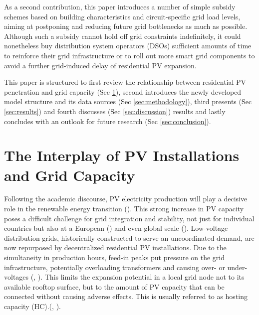 \documentclass[12PT, ]{article}
\begin{document}
As a second contribution, this paper introduces a number of simple subsidy schemes based on building characteristics and circuit-specific grid load levels, aiming at postponing and reducing future grid bottlenecks as much as possible. Although such a subsidy cannot hold off grid constraints indefinitely, it could nonetheless buy distribution system operators (DSOs) sufficient amounts of time to reinforce their grid infrastructure or to roll out more smart grid components to avoid a further grid-induced delay of residential PV expansion. 

This paper is structured to first review the relationship between residential PV penetration and grid capacity (Sec \ref{sec:lit_review}), second introduces the newly developed model structure and its data sources (Sec \ref{sec:methodology}), third presents (Sec \ref{sec:results}) and fourth discusses (Sec \ref{sec:discussion})  results and lastly concludes with an outlook for future research (Sec \ref{sec:conclusion}). 



\section{The Interplay of PV Installations and Grid Capacity} \label{sec:lit_review}%

Following the academic discourse, PV electricity production will play a decisive role in the renewable energy transition (\cite{iea_resreport2022}). 
%
This strong increase in PV capacity poses a difficult challenge for grid integration and stability, not just for individual countries but also at a European (\cite{ceer2025}) and even global scale (\cite{renewables2023}). 
%
Low-voltage distribution grids, historically constructed to serve an uncoordinated demand, are now repurposed by decentralized residential PV installations. %
Due to the simultaneity in production hours, feed-in peaks put pressure on the grid infrastructure, potentially overloading transformers and causing over- or under-voltages (\cite{ismael2019}, \cite{mulenga2020}). 
This limits the expansion potential in a local grid node not to its available rooftop surface, but to the amount of PV capacity that can be connected without causing adverse effects. This is usually referred to as hosting capacity (HC).(\cite{chathurangi2021}, \cite{mulenga2020}).
\end{document}
